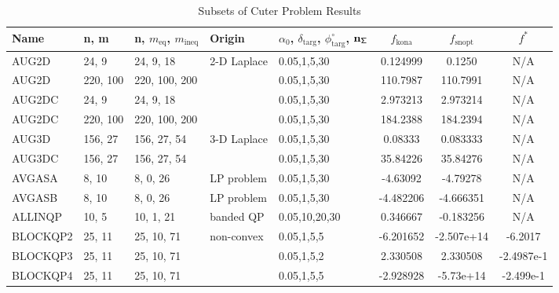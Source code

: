 \begin{landscape}
\begin{longtable}{l | l |  l  |  >{\footnotesize}p{3.5cm} | l | c | c | c  }      %
\caption{Subsets of Cuter Problem Results}\label{tab:cuter} \\
 \hline 
Name   &                 n,   m       &  n,  $m_{\text{eq}}$,  $m_{\text{ineq}}$        &     Origin      &\textbf{$\alpha_0$},  $\delta_{\text{targ}}$, $\phi^{\circ}_{\text{targ}}$,  $\mathbf{{n_{\mathsf{\Sigma}}}}$      & $ f_{\text{kona}} $   & $ f_{\text{snopt}} $ &$ f^*$    \\ \hline
AUG2D    &           24,  9         &  24,   9,  18       &    2-D Laplace   & 0.05,1,5,30   &  0.124999           &     0.1250    &      N/A                \\ \hline
AUG2D    &          220, 100   & 220, 100, 200  &                      &   0.05,1,5,30         &   110.7987          &    110.7991      &    N/A           \\ \hline
AUG2DC  &       24, 9      &   24, 9, 18       &       &     0.05,1,5,30        &    2.973213        & 2.973214    &   N/A     \\ \hline
AUG2DC  &      220, 100   &  220, 100, 200   &     &   0.05,1,5,30    & 184.2388    &   184.2394     &    N/A      \\ \hline
AUG3D  &      156, 27    & 156, 27, 54   & 3-D Laplace  &  0.05,1,5,30   & 0.08333   &   0.083333   &  N/A         \\ \hline
AUG3DC  &  156, 27  &  156, 27, 54   &    & 0.05,1,5,30 &   35.84226   &   35.84276      & N/A      \\ \hline
AVGASA  &       8, 10   &   8, 0, 26   &            LP problem     &   0.05,1,5,30       &           -4.63092    &    -4.79278   &   N/A     \\ \hline
AVGASB  &    8, 10  &   8, 0, 26   &   LP problem      & 0.05,1,5,30   &   -4.482206   &   -4.666351     &   N/A    \\ \hline
ALLINQP  & 10, 5   &  10, 1, 21   & banded QP  &  0.05,10,20,30 & 0.346667  & -0.183256     &  N/A \\  \hline     %
BLOCKQP2   & 25, 11   & 25,  10, 71   &    non-convex  & 0.05,1,5,5  & -6.201652   & -2.507e+14    &  -6.2017   \\ \hline
BLOCKQP3   & 25, 11   & 25,  10, 71  &  	  & 0.05,1,5,2 & 2.330508     &  2.330508   &            -2.4987e-1   \\ \hline
BLOCKQP4  & 25, 11    & 25, 10, 71  &    & 0.05,1,5,5     & -2.928928   & -5.73e+14   &    -2.499e-1   \\ \hline

\end{longtable}
\end{landscape}
